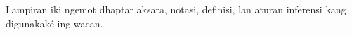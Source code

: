 \documentclass[../../include/open-logic-part]{subfiles}
\begin{document}

\begin{editorial}
Lampiran iki ngemot dhaptar aksara, notasi, definisi, lan aturan inferensi kang digunakaké ing wacan.
\end{editorial}



\OLEndPartHook
\end{document}
